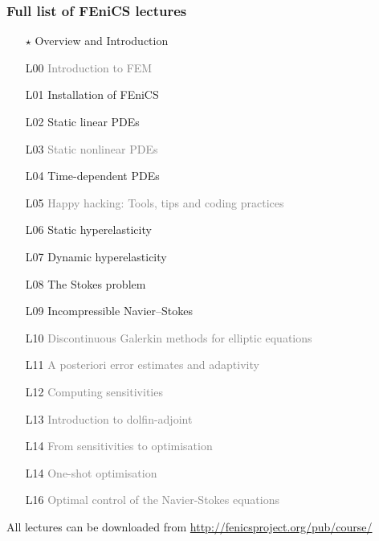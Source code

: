 \documentclass{fenicscourse}
\begin{document}
\begin{frame}
  \frametitle{Full list of FEniCS lectures}


  \scriptsize
  \begin{enumerate}
  \item[$\star$]
    Overview and Introduction
  \item[L00]
    \textcolor{grey}{Introduction to FEM}
  \item[L01]
    Installation of FEniCS
  \item[L02]
    Static linear PDEs
  \item[L03]
    \textcolor{grey}{Static nonlinear PDEs}
  \item[L04]
    Time-dependent PDEs
  \item[L05]
    \textcolor{grey}{Happy hacking: Tools, tips and coding practices}
  \item[L06]
    Static hyperelasticity
  \item[L07]
    Dynamic hyperelasticity
  \item[L08]
    The Stokes problem
  \item[L09]
    Incompressible Navier--Stokes
  \item[L10]
    \textcolor{grey}{Discontinuous Galerkin methods for elliptic equations}
  \item[L11]
    \textcolor{grey}{A posteriori error estimates and adaptivity}
  \item[L12]
    \textcolor{grey}{Computing sensitivities}
  \item[L13]
    \textcolor{grey}{Introduction to dolfin-adjoint}
  \item[L14]
    \textcolor{grey}{From sensitivities to optimisation}
  \item[L14]
    \textcolor{grey}{One-shot optimisation}
  \item[L16]
    \textcolor{grey}{Optimal control of the Navier-Stokes equations}
  \end{enumerate}

  \normalsize

  {\footnotesize All lectures can be downloaded from
    \url{http://fenicsproject.org/pub/course/}}

\end{frame}







\end{document}
